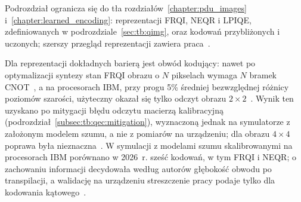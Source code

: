 Podrozdział ogranicza się do tła rozdziałów~\ref{chapter:pdu_images} i~\ref{chapter:learned_encoding}: reprezentacji FRQI, NEQR i LPIQE, zdefiniowanych w podrozdziale~\ref{sec:tb:qimg}, oraz kodowań przybliżonych i uczonych; szerszy przegląd reprezentacji zawiera praca~\cite{cai_survey_2018}.

Dla reprezentacji dokładnych barierą jest obwód kodujący: nawet po optymalizacji syntezy stan FRQI obrazu o $N$ pikselach wymaga $N$ bramek CNOT~\cite{amankwah_quantum_2022}, a na procesorach IBM, przy progu 5\% średniej bezwzględnej różnicy poziomów szarości, użyteczny okazał się tylko odczyt obrazu $2\times2$~\cite{geng_improved_2023}.
Wynik ten uzyskano po mitygacji błędu odczytu macierzą kalibracyjną (podrozdział~\ref{subsec:tb:qec:mitigation}), wyznaczoną jednak na symulatorze z założonym modelem szumu, a nie z pomiarów na urządzeniu; dla obrazu $4\times4$ poprawa była nieznaczna~\cite{geng_improved_2023}.
W symulacji z modelami szumu skalibrowanymi na procesorach IBM porównano w 2026~r. sześć kodowań, w tym FRQI i NEQR; o zachowaniu informacji decydowała według autorów głębokość obwodu po transpilacji, a walidację na urządzeniu streszczenie pracy podaje tylko dla kodowania kątowego~\cite{martinez-guerrero_quantum_2026}.

